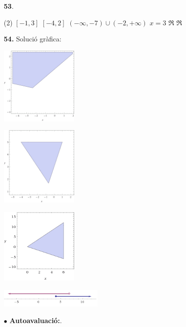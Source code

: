 \documentclass[a4paper, pdf, twoside]{book}
\begin{document}
\begin{multicols}{2}
\begin{enumerate}
 \item[\fontfamily{phv}\selectfont\color{blue}\textbf{53}. ] 
 \begin{tasks}[column-sep=1em, item-indent=1.3333em](2)
	 \task $[-1,3]$
	 \task $[-4,2]$
	 \task $(-\infty ,-7)\cup (-2,+\infty )$
	 \task $x=3$
	 \task $\Re $
	 \task $\Re $
\end{tasks}
\vspace{0.25cm}
\item[\fontfamily{phv}\selectfont\color{blue}\textbf{54. }] 
Solució gràfica: \par \includegraphics [width=0.3\textwidth ]{img-sol/t2-55a} \par \includegraphics [width=0.3\textwidth ]{img-sol/t2-55b} \par \includegraphics [width=0.3\textwidth ]{img-sol/t2-55c} \par \includegraphics [width=0.4\textwidth ]{img-sol/t2-55d} 
\vspace{0.25cm}
 \item[$\bullet$ ] {\selectfont\color{blue}\textbf{Autoavaluació:}. }


\end{enumerate}
\end{multicols}
\end{document}
